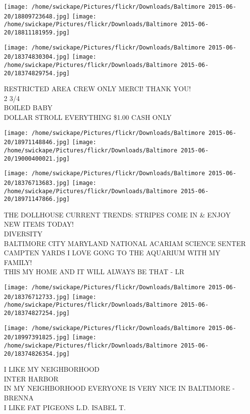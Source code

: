 \documentclass[10pt,letterpaper]{article}
\begin{document}
\texttt{[image: /home/swickape/Pictures/flickr/Downloads/Baltimore 2015-06-20/18809723648.jpg]}
\texttt{[image: /home/swickape/Pictures/flickr/Downloads/Baltimore 2015-06-20/18811181959.jpg]}

\texttt{[image: /home/swickape/Pictures/flickr/Downloads/Baltimore 2015-06-20/18374830304.jpg]}
\texttt{[image: /home/swickape/Pictures/flickr/Downloads/Baltimore 2015-06-20/18374829754.jpg]}

RESTRICTED AREA CREW ONLY MERCI!  THANK YOU!\\
2 3/4\\
BOILED BABY\\
DOLLAR STROLL EVERYTHING \$1.00 CASH ONLY\\
\pagebreak

\texttt{[image: /home/swickape/Pictures/flickr/Downloads/Baltimore 2015-06-20/18971148846.jpg]}
\texttt{[image: /home/swickape/Pictures/flickr/Downloads/Baltimore 2015-06-20/19000400021.jpg]}

\texttt{[image: /home/swickape/Pictures/flickr/Downloads/Baltimore 2015-06-20/18376713683.jpg]}
\texttt{[image: /home/swickape/Pictures/flickr/Downloads/Baltimore 2015-06-20/18971147866.jpg]}

THE DOLLHOUSE CURRENT TRENDS: STRIPES COME IN \& ENJOY NEW ITEMS TODAY!\\
DIVERSITY\\
BALTIMORE CITY MARYLAND NATIONAL ACARIAM SCIENCE SENTER CAMPTEN YARDS I LOVE GONG TO THE AQUARIUM WITH MY FAMILY!\\
THIS MY HOME AND IT WILL ALWAYS BE THAT {-} LR\\
\pagebreak

\texttt{[image: /home/swickape/Pictures/flickr/Downloads/Baltimore 2015-06-20/18376712733.jpg]}
\texttt{[image: /home/swickape/Pictures/flickr/Downloads/Baltimore 2015-06-20/18374827254.jpg]}

\texttt{[image: /home/swickape/Pictures/flickr/Downloads/Baltimore 2015-06-20/18997391825.jpg]}
\texttt{[image: /home/swickape/Pictures/flickr/Downloads/Baltimore 2015-06-20/18374826354.jpg]}

I LIKE MY NEIGHBORHOOD\\
INTER HARBOR\\
IN MY NEIGHBORHOOD EVERYONE IS VERY NICE IN BALTIMORE {-} BRENNA\\
I LIKE FAT PIGEONS L.D. ISABEL T.\\
\pagebreak
\end{document}
